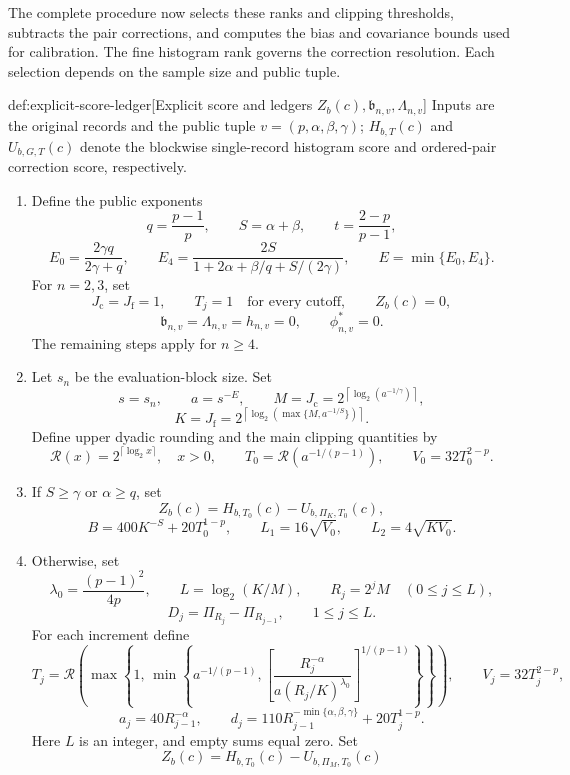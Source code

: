 The complete procedure now selects these ranks and clipping thresholds, subtracts the pair corrections, and computes the bias and covariance bounds used for calibration. The fine histogram rank  governs the correction resolution. Each selection depends on the sample size and public tuple.

\begin{algorithmv}{def:explicit-score-ledger}[Explicit score and ledgers \(Z_b(c),\mathfrak b_{n,v},\Lambda_{n,v}\)]
Inputs are the original records and the public tuple \(v=(p,\alpha,\beta,\gamma)\); \(H_{b,T}(c)\) and \(U_{b,G,T}(c)\) denote the blockwise single-record histogram score and ordered-pair correction score, respectively.
\begin{enumerate}
\item Define the public exponents
\[
q=\frac{p-1}{p},
\qquad
S=\alpha+\beta,
\qquad
t=\frac{2-p}{p-1},
\]
\[
E_0=\frac{2\gamma q}{2\gamma+q},
\qquad
E_4=\frac{2S}{1+2\alpha+\beta/q+S/(2\gamma)},
\qquad
E=\min\{E_0,E_4\}.
\]
For \(n=2,3\), set
\[
J_{\mathrm c}=J_{\mathrm f}=1,
\qquad
T_j=1\quad\text{for every cutoff},
\qquad
Z_b(c)=0,
\]
\[
\mathfrak b_{n,v}=\Lambda_{n,v}=h_{n,v}=0,
\qquad
\phi^*_{n,v}=0.
\]
The remaining steps apply for \(n\ge4\).
\item Let \(s_n\) be the evaluation-block size. Set
\[
s=s_n,
\qquad
a=s^{-E},
\qquad
M=J_{\mathrm c}
=
2^{\left\lceil\log_2(a^{-1/\gamma})\right\rceil},
\]
\[
K=J_{\mathrm f}
=
2^{\left\lceil\log_2\!\left(\max\{M,a^{-1/S}\}\right)\right\rceil}.
\]
Define upper dyadic rounding and the main clipping quantities by
\[
\mathcal R(x)=2^{\lceil\log_2x\rceil},
\quad x>0,
\qquad
T_0=\mathcal R(a^{-1/(p-1)}),
\qquad
V_0=32T_0^{2-p}.
\]
\item If \(S\ge\gamma\) or \(\alpha\ge q\), set
\[
Z_b(c)=H_{b,T_0}(c)-U_{b,\Pi_K,T_0}(c),
\]
\[
B=400K^{-S}+20T_0^{1-p},
\qquad
L_1=16\sqrt{V_0},
\qquad
L_2=4\sqrt{KV_0}.
\]
\item Otherwise, set
\[
\lambda_0=\frac{(p-1)^2}{4p},
\qquad
L=\log_2(K/M),
\qquad
R_j=2^jM\quad(0\le j\le L),
\]
\[
D_j=\Pi_{R_j}-\Pi_{R_{j-1}},
\qquad 1\le j\le L.
\]
For each increment define
\[
T_j=
\mathcal R\!\left(
\max\!\left\{
1,\,
\min\!\left\{
a^{-1/(p-1)},
\left[
\frac{R_j^{-\alpha}}{a(R_j/K)^{\lambda_0}}
\right]^{1/(p-1)}
\right\}
\right\}
\right),
\qquad
V_j=32T_j^{2-p},
\]
\[
a_j=40R_{j-1}^{-\alpha},
\qquad
d_j=
110R_{j-1}^{-\min\{\alpha,\beta,\gamma\}}
+20T_j^{1-p}.
\]
Here \(L\) is an integer, and empty sums equal zero. Set
\[
Z_b(c)=
H_{b,T_0}(c)-U_{b,\Pi_M,T_0}(c)
\]
\end{enumerate}
\end{algorithmv}

